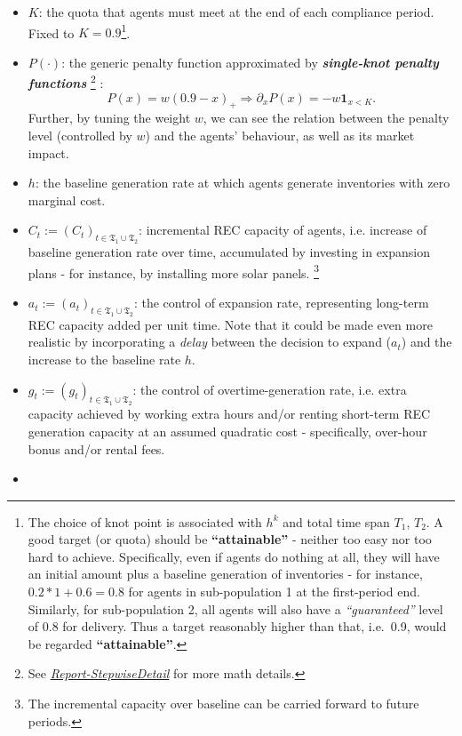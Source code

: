 \documentclass[a4paper,10pt]{article}
\newcommand{\1}{\mathbf{1}}
\begin{document}
\begin{itemize}
    
\item
  \(K\): the quota that agents must meet at the end of each compliance
  period. Fixed to \(K=0.9\)\footnote{The choice of knot point is
    associated with \(h^{k}\) and total time span \(T_1\), \(T_2\). A
    good target (or quota) should be \textbf{``attainable''} - neither
    too easy nor too hard to achieve. Specifically, even if agents do
    nothing at all, they will have an initial amount plus a baseline
    generation of inventories - for instance, \(0.2*1 + 0.6=0.8\) for
    agents in sub-population 1 at the first-period end. Similarly, for
    sub-population 2, all agents will also have a \emph{``guaranteed''}
    level of 0.8 for delivery. Thus a target reasonably higher than
    that, i.e.~0.9, would be regarded \textbf{``attainable''}.}.
\item
  \(P(\cdot)\): the generic penalty function approximated by
  \emph{\textbf{single-knot penalty functions}} \footnote{See
    \href{../FinalReports/Report-StepwiseDetail.md}{\emph{Report-StepwiseDetail}}
    for more math details.} :
  \[P(x)=w(0.9-x)_+ \Rightarrow\partial_{x}P(x) = - w\mathbf{1}_{x<K}.\]
  Further, by tuning the weight \(w\), we can see the relation between
  the penalty level (controlled by \(w\)) and the agents' behaviour, as
  well as its market impact.
\item
  \(h\): the baseline generation rate at which agents generate inventories with zero
  marginal cost.
\item
  \(C_t := (C_t)_{t\in\mathfrak{T_1} \cup \mathfrak{T_2}}\): incremental
  REC capacity of agents, i.e. increase of baseline generation rate
  over time, accumulated by investing in expansion plans - for instance,
  by installing more solar panels. \footnote{The incremental capacity
    over baseline can be carried forward to future periods.}
\item
  \(a_t := (a_t)_{t\in\mathfrak{T_1} \cup \mathfrak{T_2}}\): the control
  of expansion rate, representing long-term REC capacity added per unit
  time. Note that it could be made even more realistic by incorporating
  a \emph{delay} between the decision to expand (\(a_t\)) and the
  increase to the baseline rate \(h\).
\item
  \(g_t := (g_t)_{t\in\mathfrak{T_1} \cup \mathfrak{T_2}}\): the control
  of overtime-generation rate, i.e. extra capacity achieved by
  working extra hours and/or renting short-term REC generation capacity
  at an assumed quadratic cost - specifically, over-hour bonus and/or
  rental fees.
\item

\end{itemize}
\end{document}
